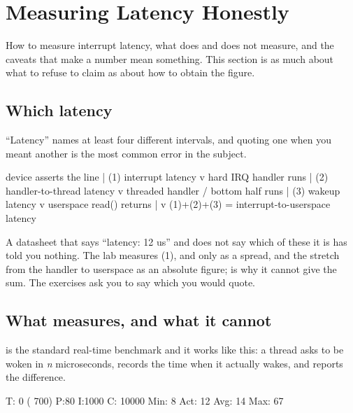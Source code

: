 
\section{Measuring Latency Honestly}
\label{c12:app:b}

How to measure interrupt latency, what  does and does not measure, and the caveats
that make a number mean something. This section is as much about what to refuse to claim as about
how to obtain the figure.

\subsection{Which latency}
\label{c12:app:b1}

``Latency'' names at least four different intervals, and quoting one when you meant another is the
most common error in the subject.

\begin{console}
  device asserts the line
       |                         (1) interrupt latency
       v
  hard IRQ handler runs
       |                         (2) handler-to-thread latency
       v
  threaded handler / bottom half runs
       |                         (3) wakeup latency
       v
  userspace read() returns
       |
       v                         (1)+(2)+(3) = interrupt-to-userspace latency
\end{console}

\noindent A datasheet that says ``latency: 12 us'' and does not say which of these it is has told
you nothing. The lab measures (1), and only as a spread, and the stretch from the handler to
userspace as an absolute figure;  is why it cannot give the sum. The exercises
ask you to say which you would quote.

\subsection{What  measures, and what it cannot}
\label{c12:app:b2}

 is the standard real-time benchmark and it works like this: a thread asks to be
woken in \emph{n} microseconds, records the time when it actually wakes, and reports the difference.

\begin{console}
T: 0 (  700) P:80 I:1000 C:  10000 Min:  8 Act: 12 Avg: 14 Max:   67
\end{console}

